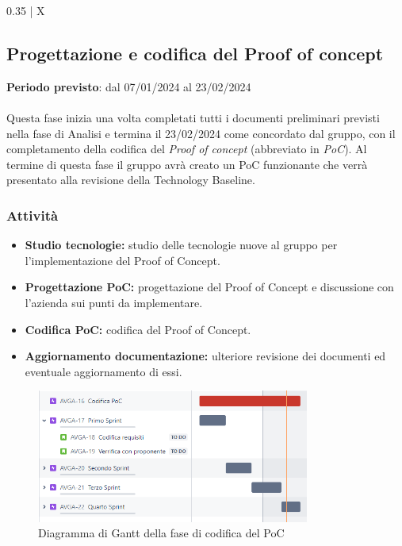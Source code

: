 \begin{xltabular}{\textwidth}{{0.35\textwidth} | X}
\caption{Tabella descrittiva del periodo 3 della fase di analisi}\label{tab:periodo1_3}
\end{xltabular}


\subsection{Progettazione e codifica del Proof of concept}\label{sec:pianificazione:progRTB}

\textbf{Periodo previsto}: dal 07/01/2024 al 23/02/2024\\\\
Questa fase inizia una volta completati tutti i documenti preliminari previsti nella fase di Analisi e termina il 23/02/2024 come concordato dal gruppo, con il completamento della codifica del \textit{Proof of concept} (abbreviato in \textit{PoC}). Al termine di questa fase il gruppo avrà creato un PoC funzionante che verrà presentato alla revisione della Technology Baseline.

\subsubsection{Attività}\label{sec:pianificazione:progRTB:attivita}
\begin{itemize}
    \item \textbf{Studio tecnologie:} studio delle tecnologie nuove al gruppo per l'implementazione del Proof of Concept.
    \item \textbf{Progettazione PoC:} progettazione del Proof of Concept e discussione con l'azienda sui punti da implementare.
    \item \textbf{Codifica PoC:} codifica del Proof of Concept.
    \item \textbf{Aggiornamento documentazione:} ulteriore revisione dei documenti ed eventuale aggiornamento di essi.
\end{itemize}

\begin{figure}[H]
    \centering
    \includegraphics[width=0.8\textwidth]{images/gantt_codRTB.PNG}
    \caption{Diagramma di Gantt della fase di codifica del PoC}
    \label{fig:gantt_codRTB}
\end{figure}


